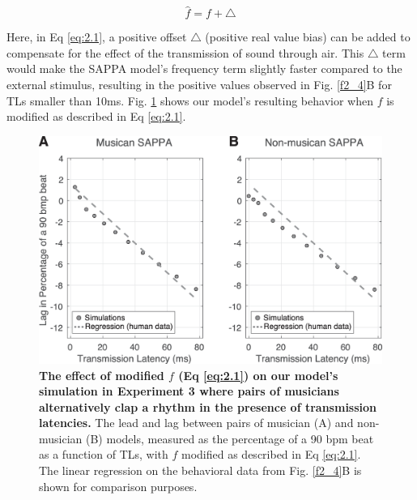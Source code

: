 \documentclass{report}
\begin{document}
\begin{equation}
\hat{f} = f + \triangle \label{eq:2.1}
\end{equation}

Here, in Eq \eqref{eq:2.1}, a positive offset $\triangle$ (positive real value bias) can be added to compensate for the effect of the transmission of sound through air. This $\triangle$ term would make the SAPPA model's frequency term slightly faster compared to the external stimulus, resulting in the positive values observed in Fig.{} \ref{f2_4}B for TLs smaller than 10ms. Fig.{} \ref{f2_5} shows our model's resulting behavior when $f$ is modified as described in Eq \eqref{eq:2.1}.

\begin{figure}
    \centering
    \includegraphics[width=1.0\textwidth]{figures/fig2_5.png}
    \caption[The effect of modified $f$ (Eq \eqref{eq:2.1}) on our model's simulation in Experiment 3 where pairs of musicians alternatively clap a rhythm in the presence of transmission latencies]{\textbf{The effect of modified $f$ (Eq \eqref{eq:2.1}) on our model's simulation in Experiment 3 where pairs of musicians alternatively clap a rhythm in the presence of transmission latencies.} The lead and lag between pairs of musician (A) and non-musician (B) models, measured as the percentage of a 90 bpm beat as a function of TLs, with $f$ modified as described in Eq \eqref{eq:2.1}. The linear regression on the behavioral data from Fig.{} \ref{f2_4}B is shown for comparison purposes.} 
    \label{f2_5}
\end{figure}
\end{document}
